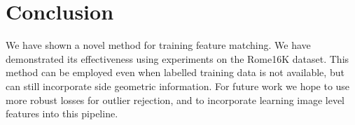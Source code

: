 \documentclass[10pt,twocolumn,letterpaper]{article}
\begin{document}
\section{Conclusion}

We have shown a novel method for training feature matching.
We have demonstrated its effectiveness using experiments on the Rome16K dataset.
This method can be employed even when labelled training data is not available, but can still incorporate side geometric information.
For future work we hope to use more robust losses for outlier rejection, and to incorporate learning image level features into this pipeline.

{\small


}
\end{document}
